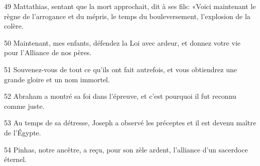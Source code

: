 
49 Mattathias, sentant que la mort approchait, dit à ses fils: «Voici maintenant le règne de l’arrogance et du mépris, le temps du bouleversement, l’explosion de la colère.

50 Maintenant, mes enfants, défendez la Loi avec ardeur, et donnez votre vie pour l’Alliance de nos pères.

51 Souvenez-vous de tout ce qu’ils ont fait autrefois, et vous obtiendrez une grande gloire et un nom immortel.

52 Abraham a montré sa foi dans l’épreuve, et c’est pourquoi il fut reconnu comme juste.

53 Au temps de sa détresse, Joseph a observé les préceptes et il est devenu maître de l’Égypte.

54 Pinhas, notre ancêtre, a reçu, pour son zèle ardent, l’alliance d’un sacerdoce éternel.
